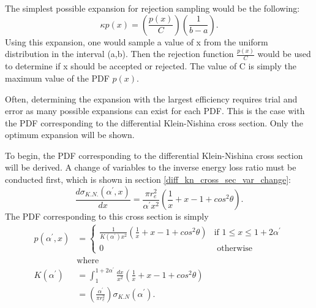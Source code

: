 The simplest possible expansion for rejection sampling would be the following:
\begin{equation*}
  \kappa p(x) = \left(\frac{p(x)}{C}\right)\left(\frac{1}{b-a}\right).
\end{equation*}
Using this expansion, one would sample a value of x from the uniform 
distribution in the interval (a,b). Then the rejection function $\frac{p(x)}{C}$
would be used to determine if x should be accepted or rejected. The value of
C is simply the maximum value of the PDF $p(x)$.

Often, determining the expansion with the largest efficiency requires trial and
error as many possible expansions can exist for each PDF. This is the case with
the PDF corresponding to the differential Klein-Nishina cross section. Only the 
optimum expansion will be shown.

To begin, the PDF corresponding to the differential Klein-Nishina cross section 
will be derived. A change of variables to the inverse energy loss ratio must
be conducted first, which is shown in section 
\ref{diff_kn_cross_sec_var_change}:
\begin{equation*}
  \frac{d\sigma_{K.N.}(\alpha^{'},x)}{dx} = \frac{\pi r_e^2}{\alpha^{'}x^2}
  \left(\frac{1}{x} + x - 1 + cos^2\theta \right).
\end{equation*}
The PDF corresponding to this cross section is simply
\begin{align}
  p(\alpha^{'},x) & = 
  \begin{cases}
    \frac{1}{K(\alpha^{'})x^2}\left(\frac{1}{x} + x - 1 + cos^2\theta \right)
    & \text{if } 1 \leq x \leq 1 + 2\alpha^{'} \\
    0 & \text{ otherwise}
  \end{cases} \\
  & \text{where} \nonumber \\
  K(\alpha^{'}) & = \int_1^{1+2\alpha^{'}} \frac{dx}{x^2}
  \left(\frac{1}{x}+x-1+cos^2\theta \right) \nonumber \\
  & = \left(\frac{\alpha^{'}}{\pi r_e^2}\right) \sigma_{K.N}(\alpha^{'}).
\end{align}

